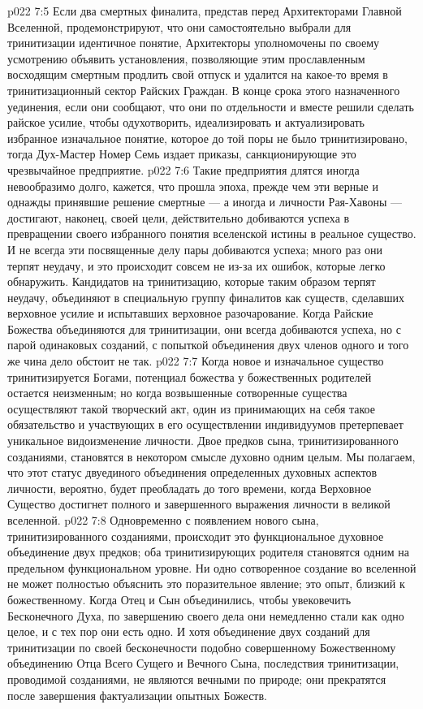 \vs p022 7:5 Если два смертных финалита, представ перед Архитекторами Главной Вселенной, продемонстрируют, что они самостоятельно выбрали для тринитизации идентичное понятие, Архитекторы уполномочены по своему усмотрению объявить установления, позволяющие этим прославленным восходящим смертным продлить свой отпуск и удалится на какое\hyp{}то время в тринитизационный сектор Райских Граждан. В конце срока этого назначенного уединения, если они сообщают, что они по отдельности и вместе решили сделать райское усилие, чтобы одухотворить, идеализировать и актуализировать избранное изначальное понятие, которое до той поры не было тринитизировано, тогда Дух\hyp{}Мастер Номер Семь издает приказы, санкционирующие это чрезвычайное предприятие.
\vs p022 7:6 Такие предприятия длятся иногда невообразимо долго, кажется, что прошла эпоха, прежде чем эти верные и однажды принявшие решение смертные --- а иногда и личности Рая\hyp{}Хавоны --- достигают, наконец, своей цели, действительно добиваются успеха в превращении своего избранного понятия вселенской истины в реальное существо. И не всегда эти посвященные делу пары добиваются успеха; много раз они терпят неудачу, и это происходит совсем не из\hyp{}за их ошибок, которые легко обнаружить. Кандидатов на тринитизацию, которые таким образом терпят неудачу, объединяют в специальную группу финалитов как существ, сделавших верховное усилие и испытавших верховное разочарование. Когда Райские Божества объединяются для тринитизации, они всегда добиваются успеха, но с парой одинаковых созданий, с попыткой объединения двух членов одного и того же чина дело обстоит не так.
\vs p022 7:7 \pc Когда новое и изначальное существо тринитизируется Богами, потенциал божества у божественных родителей остается неизменным; но когда возвышенные сотворенные существа осуществляют такой творческий акт, один из принимающих на себя такое обязательство и участвующих в его осуществлении индивидуумов претерпевает уникальное видоизменение личности. Двое предков сына, тринитизированного созданиями, становятся в некотором смысле духовно одним целым. Мы полагаем, что этот статус двуединого объединения определенных духовных аспектов личности, вероятно, будет преобладать до того времени, когда Верховное Существо достигнет полного и завершенного выражения личности в великой вселенной.
\vs p022 7:8 Одновременно с появлением нового сына, тринитизированного созданиями, происходит это функциональное духовное объединение двух предков; оба тринитизирующих родителя становятся одним на предельном функциональном уровне. Ни одно сотворенное создание во вселенной не может полностью объяснить это поразительное явление; это опыт, близкий к божественному. Когда Отец и Сын объединились, чтобы увековечить Бесконечного Духа, по завершению своего дела они немедленно стали как одно целое, и с тех пор они есть одно. И хотя объединение двух созданий для тринитизации по своей бесконечности подобно совершенному Божественному объединению Отца Всего Сущего и Вечного Сына, последствия тринитизации, проводимой созданиями, не являются вечными по природе; они прекратятся после завершения фактуализации опытных Божеств.
